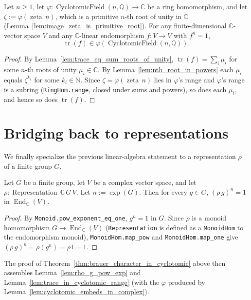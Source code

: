 \begin{lemma}
    \label{lem:trace_in_cyclotomic_range}
    Let $n \geq 1$, let
    $\varphi : \operatorname{CyclotomicField}(n,\mathbb{Q}) \to
    \mathbb{C}$ be a ring homomorphism, and let
    $\zeta := \varphi(\operatorname{zeta}\,n)$, which is a primitive
    $n$-th root of unity in $\mathbb{C}$
    (Lemma~\ref{lem:image_zeta_is_primitive_root}).  For any
    finite-dimensional $\mathbb{C}$-vector space $V$ and any
    $\mathbb{C}$-linear endomorphism $f : V \to V$ with $f^n = 1$,
    \[
        \operatorname{tr}(f) \in \varphi(\operatorname{CyclotomicField}(n,\mathbb{Q})).
    \]
\end{lemma}
\begin{proof}
    By Lemma~\ref{lem:trace_eq_sum_roots_of_unity},
    $\operatorname{tr}(f) = \sum_{i} \mu_i$ for some $n$-th roots of
    unity $\mu_i \in \mathbb{C}$. By
    Lemma~\ref{lem:nth_root_in_powers} each $\mu_i$ equals
    $\zeta^{k_i}$ for some $k_i \in \mathbb{N}$. Since
    $\zeta = \varphi(\operatorname{zeta}\,n)$ lies in
    $\varphi$'s range and $\varphi$'s range is a subring
    (\texttt{RingHom.range}, closed under sums and powers), so does
    each $\mu_i$, and hence so does $\operatorname{tr}(f)$.
\end{proof}

\section{Bridging back to representations}

We finally specialize the previous linear-algebra statement to a
representation $\rho$ of a finite group $G$.

\begin{lemma}
    \label{lem:rho_g_pow_exp}
    Let $G$ be a finite group, let $V$ be a complex vector space,
    and let $\rho : \operatorname{Representation}\,\mathbb{C}\,G\,V$.
    Let $n := \operatorname{exp}(G)$. Then for every $g \in G$,
    $(\rho\,g)^n = 1$ in $\operatorname{End}_{\mathbb{C}}(V)$.
\end{lemma}
\begin{proof}
    By \texttt{Monoid.pow\_exponent\_eq\_one}, $g^n = 1$ in $G$.
    Since $\rho$ is a monoid homomorphism $G \to
    \operatorname{End}_{\mathbb{C}}(V)$ (\texttt{Representation} is
    defined as a \texttt{MonoidHom} to the endomorphism monoid),
    \texttt{MonoidHom.map\_pow} and \texttt{MonoidHom.map\_one} give
    $(\rho\,g)^n = \rho(g^n) = \rho 1 = 1$.
\end{proof}

The proof of Theorem~\ref{thm:brauer_character_in_cyclotomic} above
then assembles
Lemma~\ref{lem:rho_g_pow_exp} and
Lemma~\ref{lem:trace_in_cyclotomic_range} (with the
$\varphi$ produced by
Lemma~\ref{lem:cyclotomic_embeds_in_complex}).


